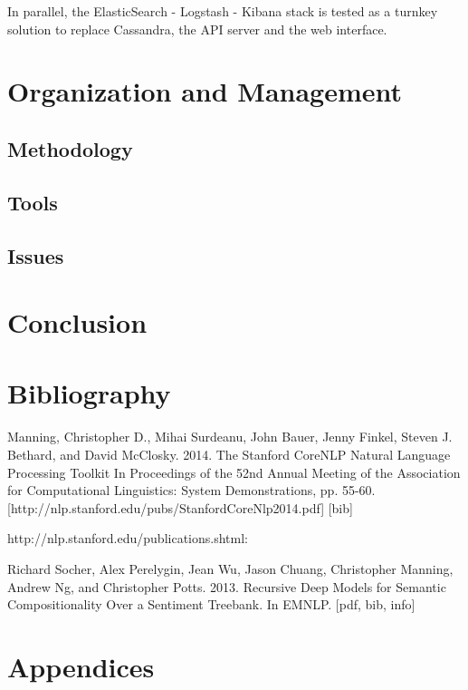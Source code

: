 \documentclass[11pt]{article}
\begin{document}
In parallel, the ElasticSearch - Logstash - Kibana stack is tested as a turnkey solution to replace Cassandra, the API server and the web interface. %

\section{Organization and Management}

\subsection{Methodology}


\subsection{Tools}


\subsection{Issues}


\section{Conclusion}


\section{Bibliography}




Manning, Christopher D., Mihai Surdeanu, John Bauer, Jenny Finkel, Steven J. Bethard, and David McClosky. 2014. The Stanford CoreNLP Natural Language Processing Toolkit In Proceedings of the 52nd Annual Meeting of the Association for Computational Linguistics: System Demonstrations, pp. 55-60. [http://nlp.stanford.edu/pubs/StanfordCoreNlp2014.pdf] [bib]

http://nlp.stanford.edu/publications.shtml:

Richard Socher, Alex Perelygin, Jean Wu, Jason Chuang, Christopher Manning, Andrew Ng, and Christopher Potts. 2013. Recursive Deep Models for Semantic Compositionality Over a Sentiment Treebank. In EMNLP. [pdf, bib, info]

\section{Appendices}
\end{document}
